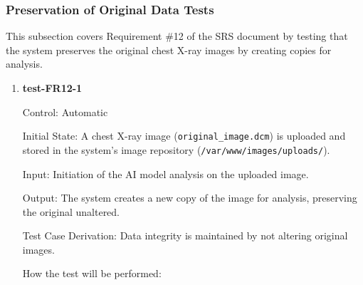 \documentclass[12pt, titlepage]{article}
\begin{document}
\subsubsection{Preservation of Original Data Tests}

This subsection covers Requirement \#12 of the SRS document by testing that the system preserves the original chest X-ray images by creating copies for analysis.

\begin{enumerate}

\item \textbf{test-FR12-1} \label{test-FR12-1}

Control: Automatic

Initial State: A chest X-ray image (\texttt{original\_image.dcm}) is uploaded and stored in the system's image repository (\texttt{/var/www/images/uploads/}).

Input: Initiation of the AI model analysis on the uploaded image.

Output: The system creates a new copy of the image for analysis, preserving the original unaltered.

Test Case Derivation: Data integrity is maintained by not altering original images.

How the test will be performed:


\end{enumerate}
\end{document}
